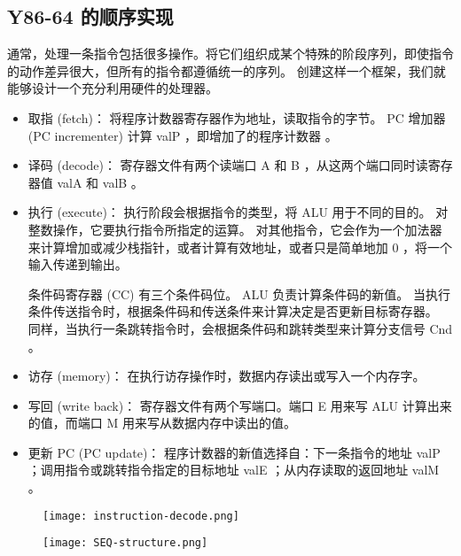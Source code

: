 \subsection{Y86-64 的顺序实现}

通常，处理一条指令包括很多操作。将它们组织成某个特殊的阶段序列，即使指令的动作差异很大，但所有的指令都遵循统一的序列。
创建这样一个框架，我们就能够设计一个充分利用硬件的处理器。
\begin{itemize}
    \item 取指 (fetch)：
          将程序计数器寄存器作为地址，读取指令的字节。 PC 增加器 (PC incrementer) 计算 valP ，即增加了的程序计数器 。
    \item 译码 (decode)：
          寄存器文件有两个读端口 A 和 B ，从这两个端口同时读寄存器值 valA 和 valB 。
    \item 执行 (execute)：
          执行阶段会根据指令的类型，将 ALU 用于不同的目的。
          对整数操作，它要执行指令所指定的运算。
          对其他指令，它会作为一个加法器来计算增加或减少栈指针，或者计算有效地址，或者只是简单地加 0 ，将一个输入传递到输出。

          条件码寄存器 (CC) 有三个条件码位。 ALU 负责计算条件码的新值。
          当执行条件传送指令时，根据条件码和传送条件来计算决定是否更新目标寄存器。
          同样，当执行一条跳转指令时，会根据条件码和跳转类型来计算分支信号 Cnd 。
    \item 访存 (memory)：
          在执行访存操作时，数据内存读出或写入一个内存字。
    \item 写回 (write back)：
          寄存器文件有两个写端口。端口 E 用来写 ALU 计算出来的值，而端口 M 用来写从数据内存中读出的值。
    \item 更新 PC (PC update)：
          程序计数器的新值选择自：下一条指令的地址 valP ；调用指令或跳转指令指定的目标地址 valE ；从内存读取的返回地址 valM 。
\end{itemize}
\begin{figure}[H]
    \centering
    \texttt{[image: instruction-decode.png]}
\end{figure}
\begin{figure}[H]
    \centering
    \texttt{[image: SEQ-structure.png]}
\end{figure}
